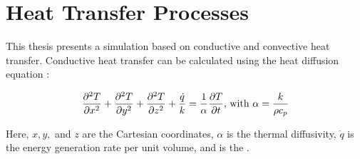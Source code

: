 \begin{landscape}
\end{landscape}

    
























\section{Heat Transfer Processes}


This thesis presents a simulation based on conductive and convective heat transfer. 
Conductive heat transfer can be calculated using the heat diffusion equation \cite{bergman2011fundamentals}:
	
	\begin{equation} 
	\frac{\partial^2 T}{\partial x^2}+
	\frac{\partial^2 T}{\partial y^2}+
	\frac{\partial^2 T}{\partial z^2}+ 
	\frac{\dot{q}}{k}= \frac{1}{\alpha}\frac{\partial T}{\partial t} \text{, with } \alpha = \frac{k}{\rho c_p}\quad \\
	\end{equation}
	
	
Here, $x,y,$ and $z$ are the Cartesian coordinates, $\alpha$ is the thermal diffusivity, $\dot{q}$ is the energy generation rate per unit volume, and  is the .
 
